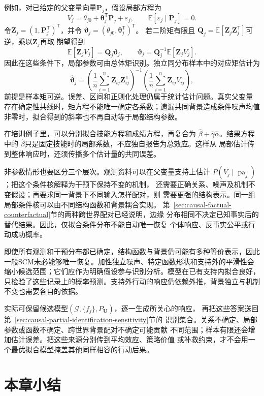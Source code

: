 例如，对已给定的父变量向量\(\bm P_j\)，假设局部方程为
\[
  V_j=\theta_{j0}+\bm\theta_j^{\mathsf T}\bm P_j+\varepsilon_j,
  \qquad
  \mathbb E[\varepsilon_j\mid\bm P_j]=0.
\]
令\(\bm Z_j=(1,\bm P_j^{\mathsf T})^{\mathsf T}\)，并令
\(\bm\vartheta_j=(\theta_{j0},\bm\theta_j^{\mathsf T})^{\mathsf T}\)。
若二阶矩有限且
\(\bm Q_j=\mathbb E[\bm Z_j\bm Z_j^{\mathsf T}]\)可逆，乘以\(\bm Z_j\)再取
期望得到
\[
  \mathbb E[\bm Z_jV_j]=\bm Q_j\bm\vartheta_j,\qquad
  \bm\vartheta_j
  =\bm Q_j^{-1}\mathbb E[\bm Z_jV_j].
\]
因此在这些条件下，局部参数可由总体矩识别。独立同分布样本中的对应矩估计为
\[
  \widehat{\bm\vartheta}_j
  =
  \left(\frac1n\sum_{i=1}^n\bm Z_{ij}\bm Z_{ij}^{\mathsf T}\right)^{-1}
  \left(\frac1n\sum_{i=1}^n\bm Z_{ij}V_{ij}\right),
\]
前提是样本矩可逆。误差、区间和正则化处理仍属于统计估计问题。真实父变量
存在确定性共线时，矩方程不能唯一确定各系数；遗漏共同背景造成条件噪声均值
非零时，拟合得到的斜率也不再自动等于局部结构参数。

在培训例子里，可以分别拟合技能方程和成绩方程，再复合为
\(\widehat\beta+\widehat\gamma\widehat\alpha\)。结果方程中的
\(\widehat\beta\)只是固定技能时的局部系数，不应独自报告为总效应。这样从
局部估计传到整体响应时，还须传播多个估计量的共同误差。

非参数情形也要区分三个层次。观测资料可以在父变量支持上估计
\(P(V_j\mid\operatorname{pa}_j)\)；把这个条件核解释为干预下保持不变的机制，
还需要正确关系、噪声及机制不变假设；再要求同一背景下不同输入怎样配对，则
需要更强的结构表示。同一组局部条件核可以由不同结构函数和背景耦合实现。
第~\ref{sec:causal-factual-counterfactual}节的两种跨世界配对已经说明，边缘
分布相同不决定已知事实后的替代结果。因此，仅拟合条件分布不能自动唯一恢复
个体响应、反事实公平或行动成功概率。

即使所有观测和干预分布都已确定，结构函数与背景仍可能有多种等价表示，因此一般SCM未必能够唯一恢复。加性独立噪声、特定函数形状和支持外的平滑性会缩小候选范围；它们应作为明确假设参与识别分析。模型在已有支持内拟合良好，只检验了这些记录上的概率预测。支持外行动的响应仍依赖外推，背景独立与机制不变也需要各自的依据。

实际可保留候选模型\((\mathcal G,\{f_j\},P_{\bm U})\)，逐一生成所关心的响应，
再把这些答案送回第~\ref{sec:causal-partial-identification-sensitivity}节的
识别集合。关系不确定、局部参数或函数不确定、跨世界背景配对不确定可能贡献
不同范围；样本有限还会增加估计误差。把这些来源分别传到平均效应、策略价值
或补救约束，才不会用一个最优拟合模型掩盖其他同样相容的行动后果。

\section{本章小结}
\label{sec:causal-inference-summary}

